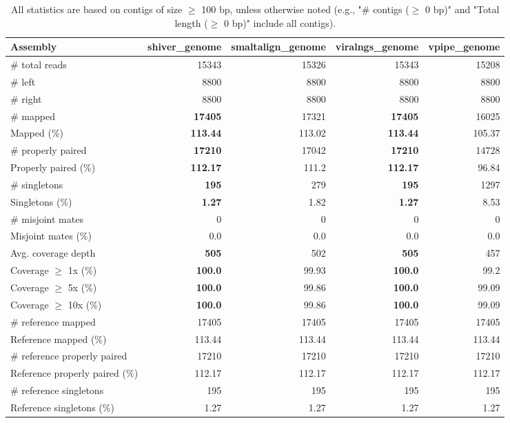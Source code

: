 \documentclass[12pt,a4paper]{article}
\begin{document}
\begin{table}[ht]
\begin{center}
\caption{All statistics are based on contigs of size $\geq$ 100 bp, unless otherwise noted (e.g., "\# contigs ($\geq$ 0 bp)" and "Total length ($\geq$ 0 bp)" include all contigs).}
\begin{tabular}{|l*{4}{|r}|}
\hline
Assembly & shiver\_genome & smaltalign\_genome & viralngs\_genome & vpipe\_genome \\ \hline
\# total reads & 15343 & 15326 & 15343 & 15208 \\ \hline
\# left & 8800 & 8800 & 8800 & 8800 \\ \hline
\# right & 8800 & 8800 & 8800 & 8800 \\ \hline
\# mapped & {\bf 17405} & 17321 & {\bf 17405} & 16025 \\ \hline
Mapped (\%) & {\bf 113.44} & 113.02 & {\bf 113.44} & 105.37 \\ \hline
\# properly paired & {\bf 17210} & 17042 & {\bf 17210} & 14728 \\ \hline
Properly paired (\%) & {\bf 112.17} & 111.2 & {\bf 112.17} & 96.84 \\ \hline
\# singletons & {\bf 195} & 279 & {\bf 195} & 1297 \\ \hline
Singletons (\%) & {\bf 1.27} & 1.82 & {\bf 1.27} & 8.53 \\ \hline
\# misjoint mates & 0 & 0 & 0 & 0 \\ \hline
Misjoint mates (\%) & 0.0 & 0.0 & 0.0 & 0.0 \\ \hline
Avg. coverage depth & {\bf 505} & 502 & {\bf 505} & 457 \\ \hline
Coverage $\geq$ 1x (\%) & {\bf 100.0} & 99.93 & {\bf 100.0} & 99.2 \\ \hline
Coverage $\geq$ 5x (\%) & {\bf 100.0} & 99.86 & {\bf 100.0} & 99.09 \\ \hline
Coverage $\geq$ 10x (\%) & {\bf 100.0} & 99.86 & {\bf 100.0} & 99.09 \\ \hline
\# reference mapped & 17405 & 17405 & 17405 & 17405 \\ \hline
Reference mapped (\%) & 113.44 & 113.44 & 113.44 & 113.44 \\ \hline
\# reference properly paired & 17210 & 17210 & 17210 & 17210 \\ \hline
Reference properly paired (\%) & 112.17 & 112.17 & 112.17 & 112.17 \\ \hline
\# reference singletons & 195 & 195 & 195 & 195 \\ \hline
Reference singletons (\%) & 1.27 & 1.27 & 1.27 & 1.27 \\ \hline

\end{tabular}
\end{center}
\end{table}
\end{document}
